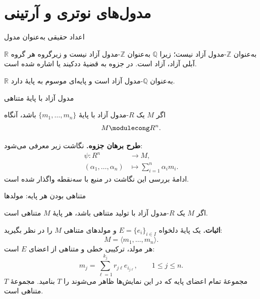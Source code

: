 \section{مدول‌های نوتری و آرتینی}

\begin{frame}[t]{اعداد حقیقی به‌عنوان مدول}
    \label{lec10:real-modules}
    \begin{remark}
        $\mathbb R$ به‌عنوان $\mathbb Z$-مدول آزاد نیست؛
        زیرا $\mathbb Q$ به‌عنوان $\mathbb Z$-مدول آزاد نیست و
        زیرگروه هر گروه آبلی آزاد، آزاد است.
        در جزوه به قضیهٔ ددکیند یا
         اشاره شده است.
    \end{remark}
    \begin{remark}
        $\mathbb R$ به‌عنوان $\mathbb Q$-مدول آزاد است
        و پایه‌ای موسوم به پایهٔ  دارد.
    \end{remark}
\end{frame}

\begin{frame}[t]{مدول آزاد با پایهٔ متناهی}
    \label{lec10:finite-free}
    \begin{lemma}
        اگر $M$ یک $R$-مدول آزاد با پایهٔ
        $\{m_1,\ldots,m_n\}$ باشد، آنگاه
        \[
            M \modulecong R^n.
        \]
    \end{lemma}
    \textbf{طرح برهان جزوه.} نگاشت زیر معرفی می‌شود:
    \[
        \begin{aligned}
            \psi:R^n&\longrightarrow M,\\
            (\alpha_1,\ldots,\alpha_n)&\longmapsto
                \sum_{i=1}^n\alpha_i m_i.
        \end{aligned}
    \]
    ادامهٔ بررسی این نگاشت در منبع با سه‌نقطه واگذار شده است.
\end{frame}

\begin{frame}[t]{متناهی بودن هر پایه: مولدها}
    \label{lec10:finite-basis-supports}
    \begin{theorem}
        اگر $M$ یک $R$-مدول آزاد با تولید متناهی باشد،
        هر پایهٔ $M$ متناهی است.
    \end{theorem}
    \textbf{اثبات.} یک پایهٔ دلخواه $E=\{e_i\}_{i\in I}$ و
    مولدهای متناهی $M$ را در نظر بگیرید:
    \[
        M=\langle m_1,\ldots,m_n\rangle.
    \]
    هر مولد، ترکیبی خطی و متناهی از اعضای $E$ است:
    \[
        m_j=\sum_{\ell=1}^{k_j}r_{j\ell}e_{i_{j\ell}},
        \qquad 1\leq j\leq n.
    \]
    مجموعهٔ تمام اعضای پایه که در این نمایش‌ها ظاهر می‌شوند
    را $T$ بنامید. مجموعهٔ $T$ متناهی است.
\end{frame}

